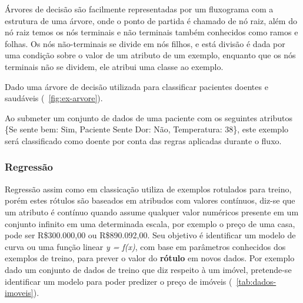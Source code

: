 Árvores de decisão são facilmente representadas por um fluxograma com a estrutura de uma árvore, onde o ponto de partida é chamado de nó raiz,
além do nó raiz temos os nós terminais e não terminais também conhecidos como ramos e folhas. Os nós não-terminais se divide em nós filhos,
e está divisão é dada por uma condição sobre o valor de um atributo de um exemplo, enquanto que os nós terminais não se dividem, ele atribui uma classe ao exemplo.

Dado uma árvore de decisão utilizada para classificar pacientes doentes e saudáveis (~\autoref{fig:ex-arvore}).

\begin{figure}[ht!]
	\centering
\end{figure}

Ao submeter um conjunto de dados de uma paciente com os seguintes atributos \{Se sente bem: Sim, Paciente Sente Dor: Não, Temperatura: 38\}, 
este exemplo será classificado como doente por conta das regras aplicadas durante o fluxo.

\subsubsection{Regressão}
\label{subsubsec{regressao}}
Regressão assim como em classicação utiliza de exemplos rotulados para treino, porém estes rótulos são baseados em atribudos com valores contínuos, 
diz-se que um atributo é contínuo quando assume qualquer valor numéricos presente em um conjunto infinito em uma determinada escala, por exemplo o preço de uma casa, 
pode ser R\$300.000,00 ou R\$890.092,00. Seu objetivo é identificar um modelo de curva ou uma função linear \textit{y = f(x)}, com base
em parâmetros conhecidos dos exemplos de treino, para prever o valor do \textbf{rótulo} em novos dados.
Por exemplo dado um conjunto de dados de treino que diz respeito à um imóvel, pretende-se identificar um modelo para poder predizer
o preço de imóveis (~\autoref{tab:dados-imoveis}).

